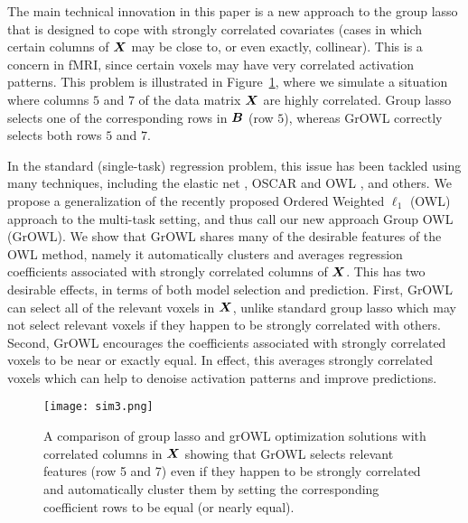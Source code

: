 The main technical innovation in this paper is a new approach to the group lasso that is
designed to cope with strongly correlated covariates (\ie cases in which certain columns
of $\boldsymbol{X}$ may be close to, or even exactly, collinear).  This is a concern in fMRI, since
certain voxels may have very correlated activation patterns. This problem is illustrated
in Figure~\ref{Fig:sim}, where we simulate a situation where columns $5$ and $7$ of the
data matrix $\boldsymbol{X}$ are highly correlated. Group lasso selects one of the corresponding rows
in $\boldsymbol{B}$ (row $5$), whereas GrOWL correctly selects both rows $5$ and $7$. 

In the standard (single-task) regression problem, this issue has been tackled using many
techniques, including the elastic net \cite{EN}, OSCAR \cite{oscar} and OWL \cite{owl},
and others.  We propose a generalization of the recently proposed Ordered Weighted
$\ell_1$ (OWL) approach to the multi-task setting, and thus call our new approach Group
OWL (GrOWL). We show that GrOWL shares many of the desirable features of the OWL method,
namely it automatically clusters and averages regression coefficients associated with
strongly correlated columns of $\boldsymbol{X}$.  This has two desirable effects, in terms of both
model selection and prediction.  First, GrOWL can select all of the relevant voxels in
$\boldsymbol{X}$, unlike standard group lasso which may not select relevant voxels if they happen to
be strongly correlated with others.  Second, GrOWL encourages the coefficients associated
with strongly correlated voxels to be near or exactly equal.   In effect, this averages
strongly correlated voxels which can help to denoise activation patterns and improve
predictions.


\begin{figure}[!t]
    \centering
    \texttt{[image: sim3.png]}
    \qquad
   \caption{A comparison of group lasso and grOWL optimization solutions with correlated columns in $\boldsymbol{X}$ showing that GrOWL selects relevant features (row 5 and 7) even if they happen to be strongly correlated and automatically cluster them by setting the corresponding coefficient rows to be equal (or nearly equal).}
    \label{Fig:sim}
  \end{figure}
